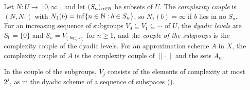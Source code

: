 \begin{definition}
\label{def:complexity-couple}
\leanok
{}
Let $N : U \to [0, \infty]$ and let $(S_n)_{n \in \mathbb{N}}$ be subsets of $U$. The \emph{complexity
couple} is $(N, N_1)$ with $N_1(b) = \inf \{n \in \mathbb{N} : b \in S_n\}$, so $N_1(b) = \infty$ if $b$
lies in no $S_n$. For an increasing sequence of subgroups $V_0 \subseteq V_1 \subseteq \cdots$ of
$U$, the \emph{dyadic levels} are $S_0 = \{0\}$ and $S_n = V_{\lfloor \log_2 n \rfloor}$ for
$n \geq 1$, and the \emph{couple of the subgroups} is the complexity couple of the dyadic levels.
For an approximation scheme $A$ in $X$, the complexity couple of $A$ is the complexity couple of
$\|\cdot\|$ and the sets $A_n$.
\end{definition}

In the couple of the subgroups, $V_j$ consists of the elements of complexity at most $2^j$, as
in the dyadic scheme of a sequence of subspaces ().

